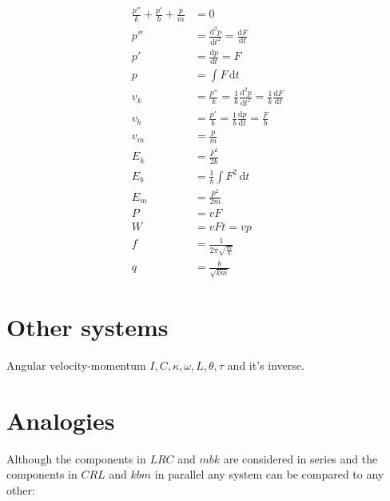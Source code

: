\documentclass[]{../common/elementary-physics}
\begin{document}
\begin{subequations}
\begin{align}
\frac{p''}{k} + \frac{p'}{b} + \frac{p}{m} &= 0 \\
p'' &= \frac{\mathrm{d}^2 p}{\mathrm{d}t^2} = \frac{\mathrm{d}F}{\mathrm{d}t} \\
p' &= \frac{\mathrm{d}p}{\mathrm{d}t} = F \\
p &= \int F \, \mathrm{d}t \tag{definition of impulse} \\
v_k &= \frac{p''}{k} = \frac{1}{k} \frac{\mathrm{d}^2 p}{\mathrm{d}t^2} = \frac{1}{k} \frac{\mathrm{d}F}{\mathrm{d}t} \\
v_b &= \frac{p'}{b} = \frac{1}{b} \frac{\mathrm{d}p}{\mathrm{d}t} = \frac{F}{b} \\
v_m &= \frac{p}{m} \tag{definition of momentum} \\
E_k &= \frac{F^2}{2 k} \tag{energy in a spring} \\
E_b &= \frac{1}{b} \int F^2 \, \mathrm{d}t \tag{losses} \\
E_m &= \frac{p^2}{2 m} \tag{kinetic energy} \\
P &= v F \tag{power} \\
W &= v F t = v p \tag{work} \\
f &= \frac{1}{2 \pi \sqrt{\frac{m}{k}}} \tag{frequency} \\
q &= \frac{b}{\sqrt{k m}} \tag{quality factor}
\end{align}
\end{subequations}

\pagebreak

\section{Other systems}

Angular velocity-momentum $I,C,\kappa,\omega,L,\theta,\tau$ and it's inverse.

\section{Analogies}

Although the components in $LRC$ and $mbk$ are considered in series and the components in $CRL$ and $kbm$ in parallel any system can be compared to any other:
\end{document}
